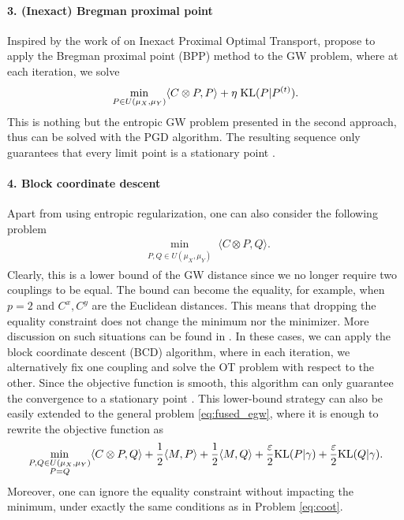 \paragraph{3. (Inexact) Bregman proximal point} Inspired by the work of \citet{Xie20} on
Inexact Proximal Optimal Transport, \citet{Xu19, Xu19b}
propose to apply the Bregman proximal point (BPP) method to the GW problem,
where at each iteration, we solve
\begin{align}
  \min_{P \in U(\mu_X, \mu_Y)} \langle C \otimes P, P \rangle + \eta \; \text{KL}(P | P^{(t)}).
\end{align}
This is nothing but the entropic GW problem presented in the second approach, thus can be solved
with the PGD algorithm. The resulting sequence only guarantees that
every limit point is a stationary point \citep{Xu19}.

\paragraph{4. Block coordinate descent} Apart from using entropic regularization,
one can also consider the following problem
\begin{align}
  \label{eq:coot}
  \min_{\substack{P, Q \in U(\mu_X, \mu_Y)}} \langle C \otimes P, Q \rangle.
\end{align}
Clearly, this is a lower bound of the GW distance since we no longer require two couplings to be equal.
The bound can become the equality, for example, when $p=2$ and $C^x, C^y$ are the Euclidean distances.
This means that dropping the equality constraint does not change the minimum nor the minimizer.
More discussion on such situations can be found in .
In these cases, we can apply the block coordinate descent (BCD) algorithm,
where in each iteration, we alternatively fix one coupling and solve the OT problem
with respect to the other. Since the objective function is smooth,
this algorithm can only guarantee the convergence to a stationary point \citep{Tseng01}.
This lower-bound strategy can also be easily extended to the general problem \eqref{eq:fused_egw},
where it is enough to rewrite the objective function as
\begin{align}
  \min_{\substack{P, Q \in U(\mu_X, \mu_Y) \\ P = Q}} \langle C \otimes P, Q \rangle
  + \frac{1}{2} \langle M, P \rangle + \frac{1}{2} \langle M, Q \rangle
  + \frac{\varepsilon}{2} \text{KL}(P | \gamma) + \frac{\varepsilon}{2} \text{KL}(Q | \gamma).
\end{align}
Moreover, one can ignore the equality constraint without impacting the minimum,
under exactly the same conditions as in Problem \eqref{eq:coot}.

